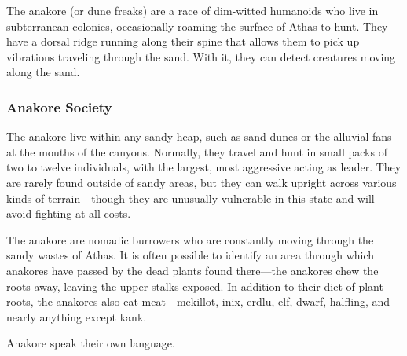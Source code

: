 The anakore (or dune freaks) are a race of dim-witted humanoids who live in subterranean colonies, occasionally roaming the surface of Athas to hunt. They have a dorsal ridge running along their spine that allows them to pick up vibrations traveling through the sand. With it, they can detect creatures moving along the sand.

\subsubsection{Anakore Society}
The anakore live within any sandy heap, such as sand dunes or the alluvial fans at the mouths of the canyons. Normally, they travel and hunt in small packs of two to twelve individuals, with the largest, most aggressive acting as leader. They are rarely found outside of sandy areas, but they can walk upright across various kinds of terrain---though they are unusually vulnerable in this state and will avoid fighting at all costs.

The anakore are nomadic burrowers who are constantly moving through the sandy wastes of Athas. It is often possible to identify an area through which anakores have passed by the dead plants found there---the anakores chew the roots away, leaving the upper stalks exposed. In addition to their diet of plant roots, the anakores also eat meat---mekillot, inix, erdlu, elf, dwarf, halfling, and nearly anything except kank.

Anakore speak their own language.


